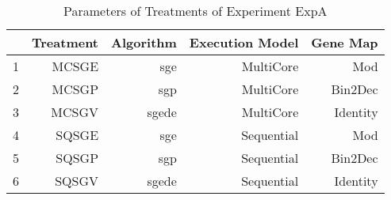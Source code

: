 \begin{table}[ht]
\centering
\begin{tabular}{rrrrr}
  \hline
 & Treatment & Algorithm & Execution Model & Gene Map \\ 
  \hline
1 & MCSGE & sge & MultiCore & Mod \\ 
  2 & MCSGP & sgp & MultiCore & Bin2Dec \\ 
  3 & MCSGV & sgede & MultiCore & Identity \\ 
  4 & SQSGE & sge & Sequential & Mod \\ 
  5 & SQSGP & sgp & Sequential & Bin2Dec \\ 
  6 & SQSGV & sgede & Sequential & Identity \\ 
   \hline
\end{tabular}
\caption{Parameters of Treatments of Experiment ExpA} 
\end{table}
